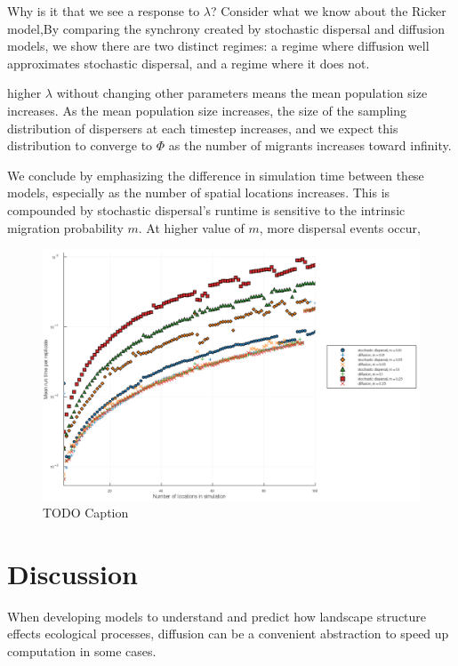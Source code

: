 \documentclass[10pt,oneside]{article}
\makeatletter
\def\maxwidth{\ifdim\Gin@nat@width>\linewidth\linewidth
\else\Gin@nat@width\fi}
\let\Oldincludegraphics\includegraphics
\renewcommand{\includegraphics}[1]{\Oldincludegraphics[width=\maxwidth]{#1}}
\makeatother
\begin{document}
Why is it that we see a response to \(\lambda\)? Consider what we know
about the Ricker model,By comparing the synchrony created by stochastic
dispersal and diffusion models, we show there are two distinct regimes:
a regime where diffusion well approximates stochastic dispersal, and a
regime where it does not.

higher \(\lambda\) without changing other parameters means the mean
population size increases. As the mean population size increases, the
size of the sampling distribution of dispersers at each timestep
increases, and we expect this distribution to converge to \(\Phi\) as
the number of migrants increases toward infinity.

We conclude by emphasizing the difference in simulation time between
these models, especially as the number of spatial locations increases.
This is compounded by stochastic dispersal's runtime is sensitive to the
intrinsic migration probability \(m\). At higher value of \(m\), more
dispersal events occur,

\begin{figure}
\hypertarget{fig:runtime}{%
\centering
\includegraphics{./figures/runtime.png}
\caption{TODO Caption}\label{fig:runtime}
}
\end{figure}

\hypertarget{discussion}{%
\section{Discussion}\label{discussion}}

When developing models to understand and predict how landscape structure
effects ecological processes, diffusion can be a convenient abstraction
to speed up computation in some cases.
\end{document}
